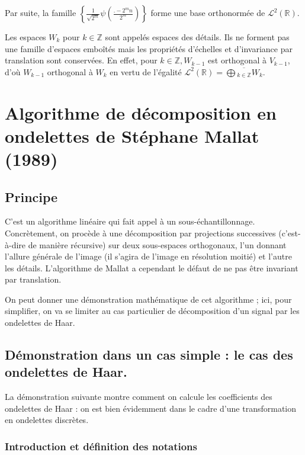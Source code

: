 \documentclass{article}
\begin{document}
Par suite, la famille $ \left\{ {\displaystyle \frac{1}{\sqrt{2^{m}}}\psi\left(\frac{.-2^{m}n}{2^{m}}\right)}\right\}$ forme une base orthonormée de $\mathcal{L}^2(\mathbb{R})$.

Les espaces $W_k$ pour $k\in\mathbb{Z}$ sont appelés espaces des détails. Ils ne forment pas une famille d'espaces emboîtés mais les propriétés d'échelles et d'invariance par translation sont conservées. En effet, pour $k \in \mathbb{Z}, W_{k-1}$ est orthogonal à $V_{k-1}$, d'où $W_{k-1}$ orthogonal à $W_k$ en vertu de l'égalité $\displaystyle \mathcal{L}^2(\mathbb{R}) = \overline{\bigoplus{}_{k\in\mathbb{Z}}W_k}$.



\section{Algorithme de décomposition en ondelettes de Stéphane Mallat (1989)}

\subsection{Principe}

C’est un algorithme linéaire qui fait appel à un sous-échantillonnage. Concrètement, on procède à une décomposition par projections successives (c’est-à-dire de manière récursive) sur deux sous-espaces orthogonaux, l’un donnant l’allure générale de l’image (il s'agira de l'image en résolution moitié) et l’autre les détails. 
L’algorithme de Mallat a cependant le défaut de ne pas être invariant par translation.

On peut donner une démonstration mathématique de cet algorithme ; ici, pour simplifier, on va se limiter au cas particulier de décomposition d’un signal par les ondelettes de Haar.


\subsection{Démonstration dans un cas simple : le cas des ondelettes de Haar.}

La démonstration suivante montre comment on calcule les coefficients des ondelettes de Haar : on est bien évidemment dans le cadre d'une transformation en ondelettes discrètes.

\subsubsection{Introduction et définition des notations}
\end{document}
